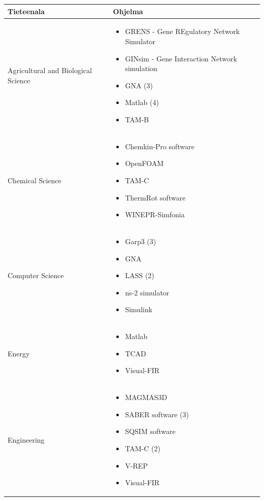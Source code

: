 \documentclass[utf8]{gradu3}
\begin{document}
\begin{longtable}[h]{|p{5cm}|p{8cm}|}
    \hline
    \textbf{Tieteenala}    &    \textbf{Ohjelma}\\
    \hline
    Agricultural and Biological Science & \begin{itemize}
        \item GRENS - Gene REgulatory Network Simulator
        \item GINsim - Gene Interaction Network simulation
        \item GNA (3)
        \item Matlab (4)
        \item TAM-B
    \end{itemize} \\
    \hline
    Chemical Science & \begin{itemize}
        \item Chemkin-Pro software
        \item OpenFOAM
        \item TAM-C
        \item ThermRot software
        \item WINEPR-Simfonia
    \end{itemize} \\
    \hline
    Computer Science & \begin{itemize}
        \item Garp3 (3)
        \item GNA
        \item LASS (2)
        \item ns-2 simulator
        \item Simulink
    \end{itemize} \\
    \hline
    Energy & \begin{itemize}
        \item Matlab
        \item TCAD
        \item Visual-FIR
    \end{itemize} \\
    \hline
    Engineering & \begin{itemize}
        \item MAGMAS3D
        \item SABER software (3)
        \item SQSIM software
        \item TAM-C (2)
        \item V-REP
        \item Visual-FIR

\end{itemize}
\end{longtable}
\end{document}

